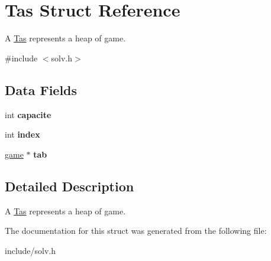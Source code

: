 \hypertarget{struct_tas}{}\section{Tas Struct Reference}
\label{struct_tas}


A \hyperlink{struct_tas}{Tas} represents a heap of game.  




{\ttfamily \#include $<$solv.\+h$>$}

\subsection*{Data Fields}
\begin{DoxyCompactItemize}
\item 
int {\bfseries capacite}\hypertarget{struct_tas_a79377bad44365baff86d50c446f84777}{}\label{struct_tas_a79377bad44365baff86d50c446f84777}

\item 
int {\bfseries index}\hypertarget{struct_tas_a750b5d744c39a06bfb13e6eb010e35d0}{}\label{struct_tas_a750b5d744c39a06bfb13e6eb010e35d0}

\item 
\hyperlink{structgame__s}{game} $\ast$ {\bfseries tab}\hypertarget{struct_tas_a9bce2443b2d72b71a0735fa7e521117b}{}\label{struct_tas_a9bce2443b2d72b71a0735fa7e521117b}

\end{DoxyCompactItemize}


\subsection{Detailed Description}
A \hyperlink{struct_tas}{Tas} represents a heap of game. 

The documentation for this struct was generated from the following file\+:\begin{DoxyCompactItemize}
\item 
include/solv.\+h\end{DoxyCompactItemize}
